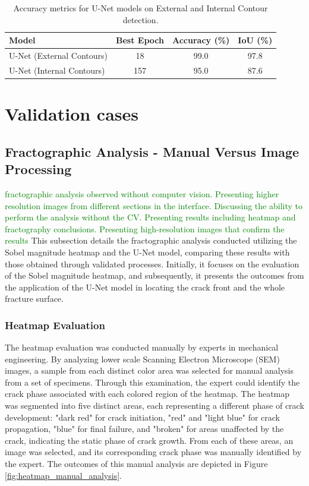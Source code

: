 \documentclass[preprint,12pt]{elsarticle}
\begin{document}
\begin{table}[ht!]
\centering
\begin{tabular}{lccc}
\hline
Model & Best Epoch & Accuracy (\%) & IoU (\%) \\ \hline
U-Net (External Contours) & 18 & 99.0 & 97.8 \\
U-Net (Internal Contours) & 157 & 95.0 & 87.6 \\ \hline
\end{tabular}
\caption{Accuracy metrics for U-Net models on External and Internal Contour detection.}
\label{tab:unet_performance}
\end{table}



\section{Validation cases}
\label{Sec: Validation cases}

\subsection{Fractographic Analysis - Manual Versus Image Processing}
\label{Subsec: Experimental Results}
\textcolor{green}{fractographic analysis observed without computer vision. Presenting higher resolution images from different sections in the interface. Discussing the ability to perform the analysis without the CV. Presenting results including heatmap and fractography conclusions. Presenting high-resolution images that confirm the results }
This subsection details the fractographic analysis conducted utilizing the Sobel magnitude heatmap and the U-Net model, comparing these results with those obtained through validated processes.
Initially, it focuses on the evaluation of the Sobel magnitude heatmap, and subsequently, it presents the outcomes from the application of the U-Net model in locating the crack front and the whole fracture surface.

\subsubsection{Heatmap Evaluation}
The heatmap evaluation was conducted manually by experts in mechanical engineering.
By analyzing lower scale Scanning Electron Microscope (SEM) images, a sample from each distinct color area was selected for manual analysis from a set of specimens. Through this examination, the expert could identify the crack phase associated with each colored region of the heatmap.
The heatmap was segmented into five distinct areas, each representing a different phase of crack development: "dark red" for crack initiation, "red" and "light blue" for crack propagation, "blue" for final failure, and "broken" for areas unaffected by the crack, indicating the static phase of crack growth. From each of these areas, an image was selected, and its corresponding crack phase was manually identified by the expert. The outcomes of this manual analysis are depicted in Figure \ref{fig:heatmap_manual_analysis}.
\end{document}

